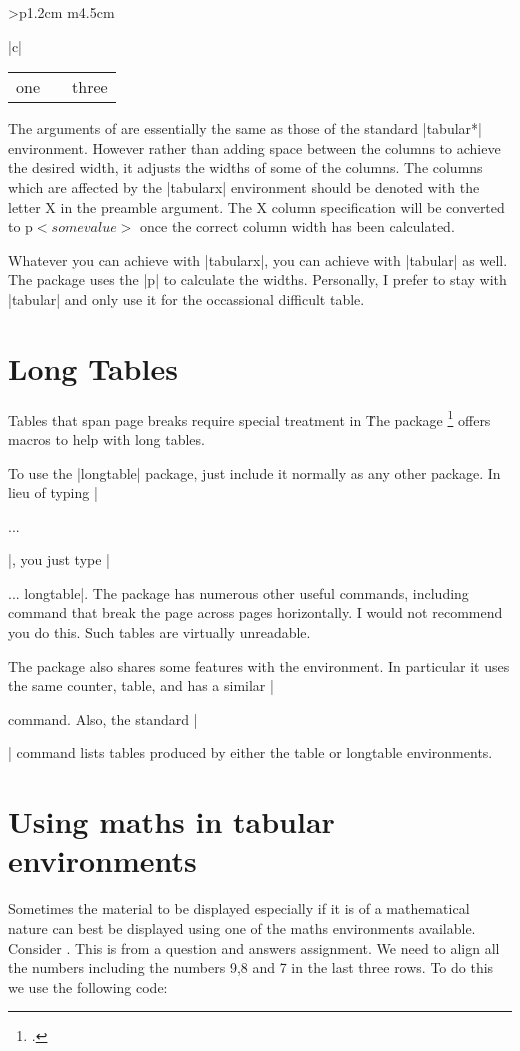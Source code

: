 \begin{tabular}{>{\bfseries}p{1.2cm} m{4.5cm}}
\begin{tabular}[t]{|c|}
{\scriptsize

\begin{tabular}{|c|p{3.0cm}|c|}
one & \lipsum[1] &three\\
\end{tabular}

}



The arguments of  are essentially the same as those of the standard
|tabular*| environment. However rather than adding space between the columns
to achieve the desired width, it adjusts the widths of some of the columns. The
columns which are affected by the |tabularx| environment should be denoted with
the letter X in the preamble argument. The X column specification will be converted
to p{$<some value>$} once the correct column width has been calculated.

Whatever you can achieve with |tabularx|, you can achieve with |tabular| as well. The package uses
the |p{}| to calculate the widths. Personally, I prefer to stay with |tabular| and only use it for
the occassional difficult table.

\section{Long Tables}

Tables that span page breaks require special treatment in  \latexe\. The package 
\footcite{longtable} offers macros to help with long tables. 

To use the |longtable| package, just include it normally as any other package. In lieu of typing
|\begin{table} ... \end{table}|, you just type |\begin{longtable} ... {longtable}|. The package has numerous other useful commands, including command that break the page across pages horizontally. I would not recommend you do this. Such tables are virtually unreadable.

The package  also shares some features with the  environment. In particular it uses the same counter, table, and has a similar
|\caption| command. Also, the standard |\listoftables| command lists tables produced by either the table or longtable environments.

\section{Using maths in tabular environments}
Sometimes the material to be displayed especially if it is of a mathematical nature can best be displayed using one of the maths environments available. Consider . This is from a question and answers assignment. We need to align all the numbers including the numbers 9,8 and 7 in the last three rows.
To do this we use the following code:
\medskip


\end{longtable}
\end{tabular}
\end{tabular}
